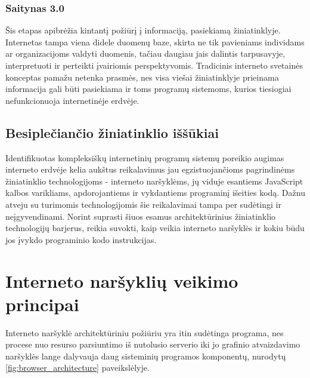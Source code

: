 \documentclass{VUMIFPSkursinis}
\begin{document}
\subsubsection{Saitynas 3.0}
Šis etapas apibrėžia kintantį požiūrį į informaciją, pasiekiamą žiniatinklyje. Internetas tampa viena didele duomenų baze, skirta ne tik pavieniams individams ar organizacijoms valdyti duomenis, tačiau daugiau jais dalintis tarpusavyje, interpretuoti ir perteikti įvairiomis perspektyvomis. Tradicinis interneto svetainės konceptas pamažu netenka prasmės, nes visa viešai žiniatinklyje prieinama informacija gali būti pasiekiama ir toms programų sistemoms, kurios tiesiogiai nefunkcionuoja internetinėje erdvėje.

\subsection{Besiplečiančio žiniatinklio iššūkiai}
Identifikuotas kompleksiškų internetinių programų sistemų poreikio augimas interneto erdvėje kelia aukštus reikalavimus jau egzistuojančioms pagrindinėms žiniatinklio technologijoms - interneto naršyklėms, jų viduje esantiems JavaScript kalbos varikliams, apdorojantiems ir vykdantiems programinį išeities kodą. Dažnu atveju su turimomis technologijomis šie reikalavimai tampa per sudėtingi ir neįgyvendinami. Norint suprasti šiuos esamus architektūrinius žiniatinklio technologijų barjerus, reikia suvokti, kaip veikia interneto naršyklės ir kokiu būdu jos įvykdo programinio kodo instrukcijas.

\section{Interneto naršyklių veikimo principai}
Interneto naršyklė architektūriniu požiūriu yra itin sudėtinga programa, nes procese nuo resurso parsiuntimo iš nutolusio serverio iki jo grafinio atvaizdavimo naršyklės lange dalyvauja daug sisteminių programos komponentų, nurodytų \ref{fig:browser_architecture} paveikslėlyje. 
\end{document}
